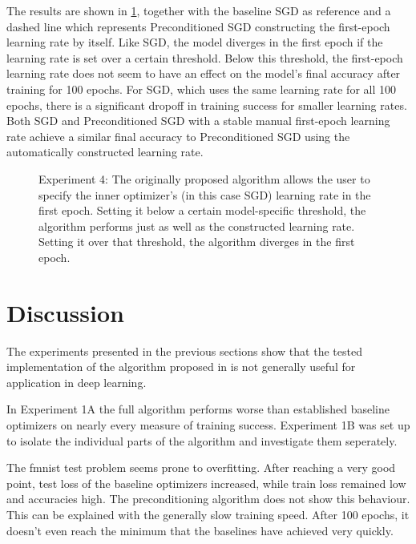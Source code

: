 \documentclass[twoside,12pt,a4paper]{report}
\begin{document}
The results are shown in \ref{fig:exp_lr_sens}, together with the baseline SGD as reference and a dashed line which represents Preconditioned SGD constructing the first-epoch learning rate by itself.
Like SGD, the model diverges in the first epoch if the learning rate is set over a certain threshold. Below this threshold, the first-epoch learning rate does not seem to have an effect on the model's final accuracy after training for 100 epochs. 
For SGD, which uses the same learning rate for all 100 epochs, there is a significant dropoff in training success for smaller learning rates.
Both SGD and Preconditioned SGD with a stable manual first-epoch learning rate achieve a similar final accuracy to Preconditioned SGD using the automatically constructed learning rate. 

\begin{figure}
	\centering \hspace{-1,5cm}
	
	\caption{Experiment 4: The originally proposed algorithm allows the user to specify the inner optimizer's (in this case SGD) learning rate in the first epoch. Setting it below a certain model-specific threshold, the algorithm performs just as well as the constructed learning rate. Setting it over that threshold, the algorithm diverges in the first epoch.}
	\label{fig:exp_lr_sens}
\end{figure}



\section{Discussion} %
The experiments presented in the previous sections show that the tested implementation of the algorithm proposed in \cite{roos2019active} is not generally useful for application in deep learning.

In Experiment 1A the full algorithm performs worse than established baseline optimizers on nearly every measure of training success.
Experiment 1B was set up to isolate the individual parts of the algorithm and investigate them seperately.

The fmnist test problem seems prone to overfitting. After reaching a very good point, test loss of the baseline optimizers increased, while train loss remained low and accuracies high. The preconditioning algorithm does not show this behaviour. This can be explained with the generally slow training speed. After 100 epochs, it doesn't even reach the minimum that the baselines have achieved very quickly.
\end{document}
